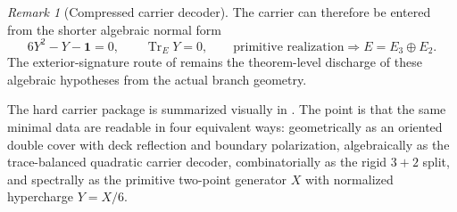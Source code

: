 \documentclass[11pt,a4paper]{article}
\theoremstyle{definition}
\theoremstyle{remark}
\newtheorem*{remark}{Remark}
\DeclareMathOperator{\tr}{Tr}
\begin{document}
\begin{remark}[Compressed carrier decoder]
The carrier can therefore be entered from the shorter algebraic normal form
\[
6Y^2-Y-\mathbf 1=0,
\qquad
\tr_EY=0,
\qquad
\text{primitive realization}
\Longrightarrow
E=E_3\oplus E_2.
\]
The exterior-signature route of  remains the theorem-level discharge
of these algebraic hypotheses from the actual branch geometry.
\end{remark}

The hard carrier package is summarized visually in . The point is
that the same minimal data are readable in four equivalent ways: geometrically as an oriented
double cover with deck reflection and boundary polarization, algebraically as the trace-balanced
quadratic carrier decoder, combinatorially as the rigid $3+2$ split, and spectrally as the
primitive two-point generator $X$ with normalized hypercharge $Y=X/6$.
\end{document}
